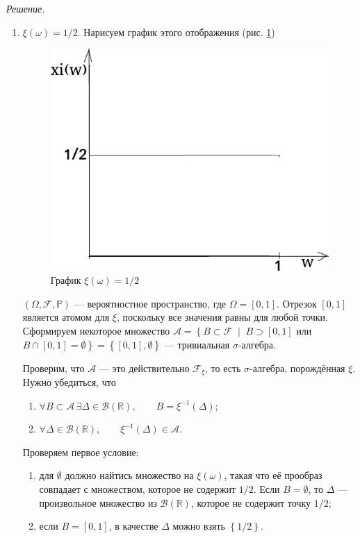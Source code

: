\textit{Решение.}
\begin{enumerate}[label=\alph*)]
\item $ \xi \left( \omega \right) = 1/2 $.
Нарисуем график этого отображения (рис. \ref{fig:88})

\begin{figure}[h!]
  \centering
  \includegraphics[width=.4\textwidth]{./pictures/8_8.png}
  \caption{График $ \xi \left( \omega \right) = 1/2 $}
  \label{fig:88}
\end{figure}

$ \left( \Omega, \mathcal{F}, \mathbb{P} \right) $ --- вероятностное пространство, где $ \Omega = \left[ 0, 1 \right] $.
Отрезок $ \left[ 0, 1 \right] $ является атомом для $ \xi $, поскольку все значения равны для любой точки.
Сформируем некоторое множество
$ \mathcal{A} =
\left\{ B \subset \mathcal{F} \; \middle| \; B \supset \left[ 0, 1 \right] \right.$
или $\left. B \cap \left[ 0, 1 \right] = \emptyset \right\} = \left\{ \left[ 0, 1 \right], \emptyset \right\} $ --- тривиальная $ \sigma $-алгебра.

Проверим, что $ \mathcal{A} $ --- это действительно $ \mathcal{F}_{ \xi } $, то есть $ \sigma $-алгебра, порождённая $ \xi $.
Нужно убедиться, что
\begin{enumerate}
\item $ \forall B \subset \mathcal{A} \, \exists \Delta \in \mathcal{B} \left( \mathbb{R} \right), \qquad B = \xi^{-1} \left( \Delta \right) $;
\item $ \forall \Delta \in \mathcal{B} \left( \mathbb{R} \right), \qquad \xi^{-1} \left( \Delta \right) \in \mathcal{A} $.
\end{enumerate}

Проверяем первое условие:
\begin{enumerate}[label=\alph*)]
\item для $ \emptyset $ должно найтись множество на $ \xi \left( \omega \right) $, такая что её прообраз совпадает с множеством, которое не содержит $1/2$.
Если $B = \emptyset $, то $ \Delta $ --- произвольное множество из $ \mathcal{B} \left( \mathbb{R} \right) $, которое не содержит точку $1/2$; 
\item если $B = \left[ 0, 1 \right] $, в качестве $ \Delta $ можно взять $ \left\{ 1/2 \right\} $.
\end{enumerate}


\end{enumerate}
